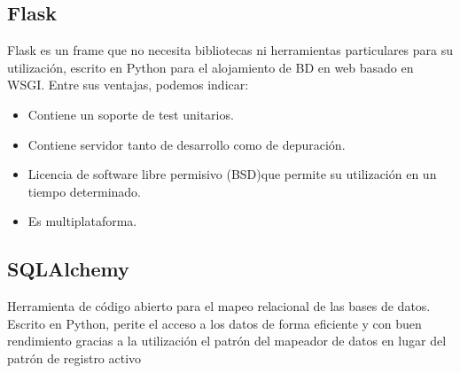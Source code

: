 \subsection{Flask}
Flask es un frame que no necesita bibliotecas ni herramientas particulares para su utilización, escrito en Python para el alojamiento de BD en web basado en WSGI. 
Entre sus ventajas, podemos indicar: 
\begin{itemize}
\item Contiene un soporte de test unitarios. 
\item Contiene servidor tanto de desarrollo como de depuración. 
\item Licencia de software libre permisivo (BSD)que permite su utilización en un tiempo determinado. 
\item Es multiplataforma. 
\end{itemize}

\subsection{SQLAlchemy}
Herramienta de código abierto para el mapeo relacional de las bases de datos. Escrito en Python, perite el acceso a los datos de forma eficiente y con buen rendimiento gracias a la utilización el patrón del mapeador de datos en lugar del patrón de registro activo \cite{wiki:sqlalchemy}
